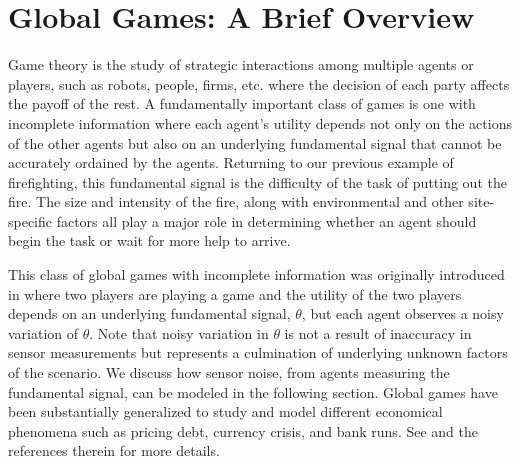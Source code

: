 \documentclass[conference]{IEEEtran}
\begin{document}
\section{Global Games: A Brief Overview}\label{sec:ggoverview}
Game theory is the study of strategic interactions among multiple agents or players, such as robots, people, firms, etc. where the decision of each party affects the payoff of the rest. A fundamentally important class of games is one with incomplete information where each agent's utility depends not only on the actions of the other agents but also on an underlying fundamental signal that cannot be accurately ordained by the agents. Returning to our previous example of firefighting, this fundamental signal is the difficulty of the task of putting out the fire. The size and intensity of the fire, along with environmental and other site-specific factors all play a major role in determining whether an agent should begin the task or wait for more help to arrive. 

This class of global games with incomplete information was originally introduced in \cite{Carlsson1993} where two players are playing a game and the utility of the two players depends on an underlying fundamental signal, $\theta$, but each agent observes a noisy variation of $\theta$. Note that noisy variation in $\theta$ is not a result of inaccuracy in sensor measurements but represents a culmination of underlying unknown factors of the scenario. We discuss how sensor noise, from agents measuring the fundamental signal, can be modeled in the following section. Global games have been substantially generalized to study and model different economical phenomena such as pricing debt, currency crisis, and bank runs. See \cite{Morris2000} and the references therein for more details.
\end{document}
